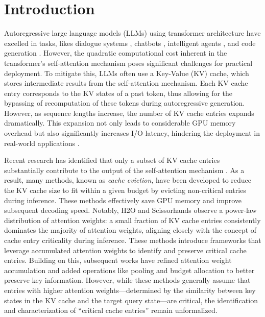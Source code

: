 \section{Introduction}

Autoregressive large language models (LLMs) using transformer architecture have excelled in tasks, likes dialogue systems \citep{yi2024survey}, chatbots \citep{achiam2023gpt}, intelligent agents \citep{Wang_2024}, and code generation \citep{gu2023llm}. However, the quadratic computational cost inherent in the transformer’s self-attention mechanism poses significant challenges for practical deployment.
To mitigate this, LLMs often use a Key-Value (KV) cache, which stores intermediate results from the self-attention mechanism. Each KV cache entry corresponds to the KV states of a past token, thus allowing for the bypassing of recomputation of these tokens during autoregressive generation. However, as sequence lengths increase, the number of KV cache entries expands dramatically.
This expansion not only leads to considerable GPU memory overhead but also significantly increases I/O latency, hindering the deployment in real-world applications \citep{sun2024triforce}.

Recent research has identified that only a subset of KV cache entries substantially contribute to the output of the self-attention mechanism \citep{h2o,liu2024scissorhands,quest}. As a result, many methods, known as {\it cache eviction}, have been developed to reduce the KV cache size to fit within a given budget by evicting non-critical entries during inference. These methods effectively save GPU memory and improve subsequent decoding speed.
Notably,  H2O \citep{h2o} and Scissorhands \citep{liu2024scissorhands} observe a power-law distribution of attention weights: a small fraction of KV cache entries consistently dominates the majority of attention weights, aligning closely with the concept of cache entry criticality during inference. 
These methods introduce frameworks that leverage accumulated attention weights to identify and preserve critical cache entries.
Building on this, subsequent works \citep{adnan2024keyformer,SnapKV,ada} have refined attention weight accumulation and added operations like pooling and budget allocation to better preserve key information.
However, while these methods generally assume that entries with higher attention weights---determined by the similarity between key states in the KV cache and the target query state---are critical, the identification and characterization of ``critical cache entries'' remain unformalized.


